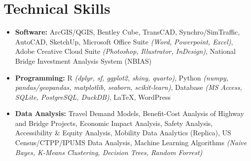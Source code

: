 \section{\faPuzzlePiece \textbf{ Technical Skills}}
    \begin{itemize}[leftmargin=0.15in, label={-}]
    	\item{\textbf{Software: }{ArcGIS/QGIS, Bentley Cube, TransCAD, Synchro/SimTraffic, AutoCAD, SketchUp, Microsoft Office Suite \textit{(Word, Powerpoint, Excel)}, Adobe Creative Cloud Suite \textit{(Photoshop, Illustrator, InDesign)}, National Bridge Investment Analysis System (NBIAS)}} \\
        \item{\textbf{Programming: }{R \textit{(dplyr, sf, ggplot2, shiny, quarto)}, Python \textit{(numpy, pandas/geopandas, matplotlib, seaborn, scikit-learn)}, Database \textit{(MS Access, SQLite, PostgreSQL, DuckDB)}, LaTeX, WordPress}} \\
        \item{\textbf{Data Analysis: }{Travel Demand Models, Benefit-Cost Analysis of Highway and Bridge Projects, Economic Impact Analysis, Safety Analysis, Accessibility \& Equity Analysis, Mobility Data Analytics (Replica), US Census/CTPP/IPUMS Data Analysis, Machine Learning Algorithms \textit{(Naive Bayes, K-Means Clustering, Decision Trees, Random Forrest)}}}
    \end{itemize}